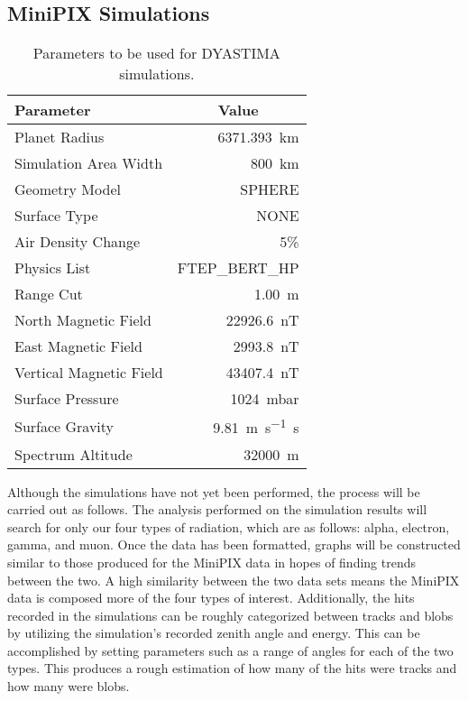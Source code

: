\subsection{MiniPIX Simulations}
\label{sec:MiniPIX Simulations Discussion}

\begin{table}[!h]
  \begin{center}
    \caption{Parameters to be used for DYASTIMA simulations.} 
    \label{tab:dyastima}
    \bigskip
    \begin{tabular}{|l|r|}
      \hline
      {\bf Parameter} &
      \multicolumn{1}{c|}{\bf Value} \\
      \hline
      Planet Radius & \SI{6371.393}{\kilo\meter} \\ \hline
      Simulation Area Width & \SI{800}{\kilo\meter} \\ \hline
      Geometry Model & SPHERE \\ \hline
      Surface Type & NONE \\ \hline
      Air Density Change & 5\% \\ \hline
      Physics List & FTEP\_BERT\_HP \\ \hline
      Range Cut & \SI{1.00}{\meter} \\ \hline
      North Magnetic Field & \SI{22926.6}{\nano\tesla} \\ \hline
      East Magnetic Field & \SI{2993.8}{\nano\tesla} \\ \hline
      Vertical Magnetic Field & \SI{43407.4}{\nano\tesla} \\ \hline
      Surface Pressure & \SI{1024}{\milli\bar} \\ \hline
      Surface Gravity & \SI{9.81}{\meter\per\second\second} \\ \hline
      Spectrum Altitude & \SI{32000}{\meter} \\ \hline
    \end{tabular}
  \end{center}
\end{table}

Although the simulations have not yet been performed, the process will be carried out as follows. The analysis performed on the simulation results will search for only our four types of radiation, which are as follows: alpha, electron, gamma, and muon. Once the data has been formatted, graphs will be constructed similar to those produced for the MiniPIX data in hopes of finding trends between the two. A high similarity between the two data sets means the MiniPIX data is composed more of the four types of interest. Additionally, the hits recorded in the simulations can be roughly categorized between tracks and blobs by utilizing the simulation's recorded zenith angle and energy. This can be accomplished by setting parameters such as a range of angles for each of the two types. This produces a rough estimation of how many of the hits were tracks and how many were blobs. 

